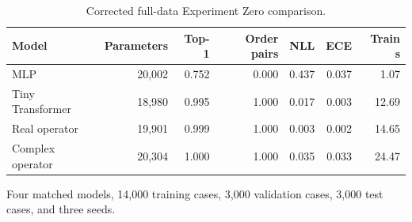 \begin{table}[t]
\centering
\caption{Corrected full-data Experiment Zero comparison.}
\label{tab:full_data}
\begin{tabular}{lrrrrrr}
\toprule
Model & Parameters & Top-1 & Order pairs & NLL & ECE & Train s \\
\midrule
MLP & 20,002 & 0.752 & 0.000 & 0.437 & 0.037 & 1.07 \\
Tiny Transformer & 18,980 & 0.995 & 1.000 & 0.017 & 0.003 & 12.69 \\
Real operator & 19,901 & 0.999 & 1.000 & 0.003 & 0.002 & 14.65 \\
Complex operator & 20,304 & 1.000 & 1.000 & 0.035 & 0.033 & 24.47 \\
\bottomrule
\end{tabular}
\begin{minipage}{0.96\linewidth}\footnotesize Four matched models, 14,000 training cases, 3,000 validation cases, 3,000 test cases, and three seeds.\end{minipage}
\end{table}
